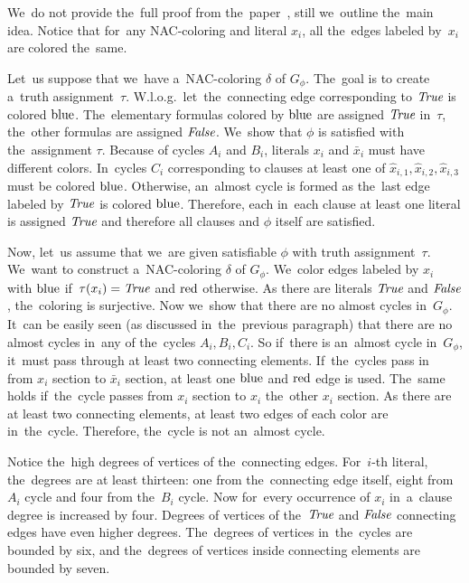 We~do not provide the~full proof from the~paper~\cite{np_complete},
still we~outline the~main idea.
Notice that for~any NAC-coloring and literal \( x_i \),
all the~edges labeled by~\( x_i \) are colored the~same.

Let~us suppose that we~have a~NAC-coloring \( \delta \) of \( G_\phi \).
The~goal is to create a~truth assignment~\( \tau \).
W.l.o.g.\ let~the~connecting edge corresponding to \( \textit{True} \) is colored \( \text{blue} \).
The~elementary formulas colored by \( \text{blue} \) are assigned \( \textit{True} \) in~\( \tau \),
the~other formulas are assigned \( \textit{False} \).
We~show that \( \phi \) is satisfied with the~assignment \( \tau \).
Because of cycles \( A_i \) and \( B_i \), literals \( x_i \) and \( \bar{x}_i \)
must have different colors. In~cycles \( C_i \) corresponding to clauses
at least one of \( \hat{x}_{i,1}, \hat{x}_{i,2}, \hat{x}_{i,3} \) must be colored \( \text{blue} \).
Otherwise, an~almost cycle is formed as the~last edge labeled by \( \textit{True} \) is colored \( \text{blue} \).
Therefore, each in~each clause at least one literal is assigned \( \textit{True} \)
and therefore all clauses and \( \phi \) itself are satisfied.

Now, let~us assume that we~are given satisfiable \( \phi \)
with truth assignment~\( \tau \).
We~want to construct a~NAC-coloring \( \delta \) of \( G_\phi \).
We~color edges labeled by \( x_i \) with \( \text{blue} \) if~\( \tau(x_i) = \textit{True} \)
and \( \text{red} \) otherwise.
As there are literals \( \textit{True} \) and \( \textit{False} \), the~coloring is surjective.
Now we~show that there are no almost cycles in~\( G_\phi \).
It~can be easily seen (as discussed in~the~previous paragraph)
that there are no almost cycles in~any of the~cycles \( A_i, B_i, C_i \).
So if~there is an~almost cycle in~\( G_\phi \), it~must pass through
at least two connecting elements.
If~the~cycles pass in~
from \( x_i \) section to \( \bar{x}_i \) section, at least one \( \text{blue} \)
and \( \text{red} \) edge is used. The~same holds if~the~cycle passes
from \( x_i \) section to \( x_i \) the~other \( x_i \) section.
As there are at least two connecting elements, at least two edges of each color are in~the~cycle.
Therefore, the~cycle is not an~almost cycle.

Notice the~high degrees of vertices of the~connecting edges.
For~\( i \)-th literal, the~degrees are at least thirteen:
one from the~connecting edge itself,
eight from \( A_i \) cycle and four from the~\( B_i \) cycle.
Now for~every occurrence of \( x_i \) in~a~clause degree is increased by four.
%
Degrees of vertices of the~\( \textit{True} \) and \( \textit{False} \) connecting edges
have even higher degrees.
%
The~degrees of vertices in~the~cycles are bounded by six,
and the~degrees of vertices inside connecting elements are bounded by seven.


